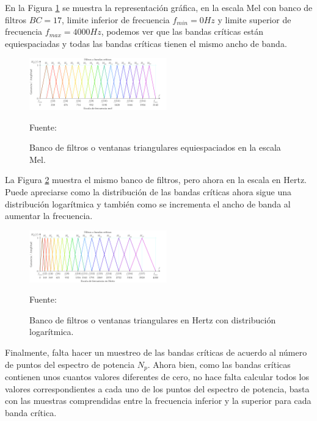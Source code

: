 \begin{enumerate}
\begin{enumerate}
En la Figura \ref{fig:figura2.42} se muestra la representación gráfica, en la escala Mel con banco de filtros $BC = 17$, limite inferior de frecuencia $f_{min} = 0 Hz$ y limite superior de frecuencia $f_{max} = 4000 Hz$, podemos ver que las bandas críticas están equiespaciadas y todas las bandas críticas tienen el mismo ancho de banda.
\begin{figure}[H]
\begin{center}
\includegraphics[width=0.53\textwidth]{Imagenes/Cap2/image043}
\end{center}
\begin{center}
\vskip -0.5cm
\caption{\small{Banco de filtros o ventanas triangulares equiespaciados en la escala Mel.}}
\label{fig:figura2.42}
{\small{Fuente: \cite{eyra}}}
\end{center}
\end{figure}
\vskip -0.5cm
La Figura \ref{fig:figura2.43} muestra el mismo banco de filtros, pero ahora en la escala en Hertz. Puede apreciarse como la distribución de las bandas críticas ahora sigue una distribución logarítmica y también como se incrementa el ancho de banda al aumentar la frecuencia.
\begin{figure}[H]
\begin{center}
\includegraphics[width=0.53\textwidth]{Imagenes/Cap2/image044}
\end{center}
\begin{center}
\vskip -0.5cm
\caption{\small{Banco de filtros o ventanas triangulares en Hertz con distribución logarítmica.}}
\label{fig:figura2.43}
{\small{Fuente: \cite{eyra}}}
\end{center}
\end{figure}
\newpage
Finalmente, falta hacer un muestreo de las bandas críticas de acuerdo al número de puntos del espectro de potencia $N_{p}.$ Ahora bien, como las bandas críticas contienen unos cuantos valores diferentes de cero, no hace falta calcular todos los valores correspondientes a cada uno de los puntos del espectro de potencia, basta con las muestras comprendidas entre la frecuencia inferior y la superior para cada banda crítica.

\end{enumerate}
\end{enumerate}
